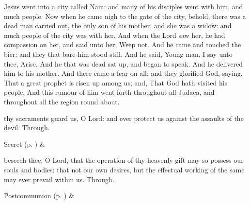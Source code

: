 
 Jesus went into a city called Nain; and many of his disciples went with him, and much people. Now when he came nigh to the gate of the city, behold, there was a dead man carried out, the only son of his mother, and she was a widow: and much people of the city was with her. And when the Lord saw her, he had compassion on her, and said unto her, Weep not. And he came and touched the bier: and they that bare him stood still. And he said, Young man, I say unto thee, Arise. And he that was dead sat up, and began to speak. And he delivered him to his mother. And there came a fear on all: and they glorified God, saying, That a great prophet is risen up among us; and, That God hath visited his people. And this rumour of him went forth throughout all Judaea, and throughout all the region round about.


\secret
{} thy sacraments guard us, O Lord: and ever protect us against the assaults of the devil. Through.


\begin{rubric}
     Secret  (p. \pageref{SPSaints}) \&  
\end{rubric}


\postcommunion
{} beseech thee, O Lord, that the operation of thy heavenly gift may so possess our souls and bodies: that not our own desires, but the effectual working of the same may ever prevail within us. Through.
\begin{rubric}
     Postcommunion  (p. \pageref{SPSaints}) \&  
\end{rubric}


\clearpage
{}

